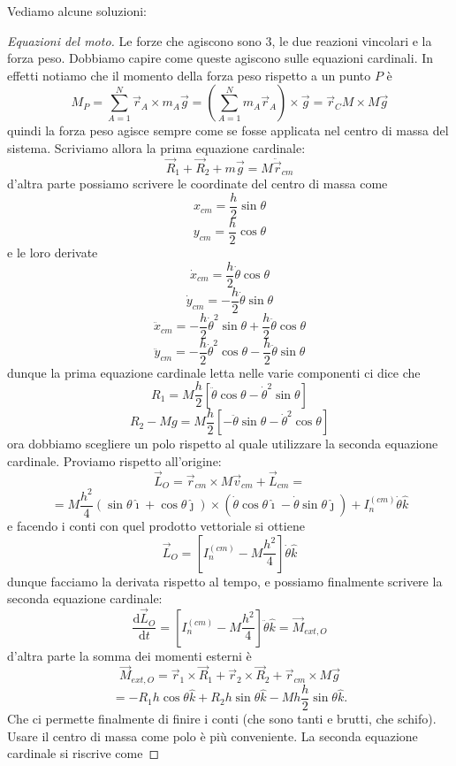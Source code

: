 \documentclass[11pt]{scrartcl}
\newcommand{\dif}{\text{d}}
\newcommand{\ihat}{\hat{\imath}}
\newcommand{\jhat}{\hat{\jmath}}
\newcommand{\khat}{\hat{k}}
\newcommand{\posit}{\vec{r}}
\newcommand{\accel}{\ddot{\vec{r}}}
\begin{document}
	\begin{sol}
		Vediamo alcune soluzioni:
		\begin{proof}[Equazioni del moto]
			Le forze che agiscono sono $3$, le due reazioni vincolari e la forza peso. Dobbiamo capire come queste agiscono sulle equazioni cardinali. In effetti notiamo che il momento della forza peso rispetto a un punto $P$ è
			$$M_P=\sum_{A=1}^{N}\posit_A \times m_A\vec{g}=\left(\sum_{A=1}^{N}m_A\posit_A\right)\times \vec{g}=\posit_CM\times M\vec{g}$$
			quindi la forza peso agisce sempre come se fosse applicata nel centro di massa del sistema. Scriviamo allora la prima equazione cardinale:
			$$\vec{R}_1+\vec{R}_2+m\vec{g}=M\accel_{cm}$$
			d'altra parte possiamo scrivere le coordinate del centro di massa come
			$$x_{cm}=\frac{h}{2}\sin\theta$$
			$$y_{cm}=\frac{h}{2}\cos\theta$$
			e le loro derivate
			$$\dot{x}_{cm}=\frac{h}{2}\dot{\theta}\cos\theta$$
			$$\dot{y}_{cm}=-\frac{h}{2}\dot{\theta}\sin\theta$$
			$$\ddot{x}_{cm}=-\frac{h}{2}\dot{\theta}^2\sin\theta+\frac{h}{2}\ddot{\theta}\cos\theta$$
			$$\ddot{y}_{cm}=-\frac{h}{2}\dot{\theta}^2\cos\theta-\frac{h}{2}\ddot{\theta}\sin\theta$$
			dunque la prima equazione cardinale letta nelle varie componenti ci dice che
			$$R_1=M\frac{h}{2}\left[\ddot{\theta}\cos\theta-\dot{\theta}^2\sin\theta\right]$$
			$$R_2-Mg=M\frac{h}{2}\left[-\ddot{\theta}\sin\theta-\dot{\theta}^2\cos\theta\right]$$
			ora dobbiamo scegliere un polo rispetto al quale utilizzare la seconda equazione cardinale. Proviamo rispetto all'origine:
			$$\vec{L}_O=\posit_{cm}\times M\vec{v}_{cm}+\vec{L}_{cm}=$$
			$$=M\frac{h^2}{4}\left(\sin\theta\ihat+\cos\theta\jhat\right)\times \left(\dot{\theta}\cos\theta\ihat-\dot{\theta}\sin\theta\jhat\right)+I_n^{(cm)}\dot{\theta}\khat$$
			e facendo i conti con quel prodotto vettoriale si ottiene
			$$\vec{L}_O=\left[I_n^{(cm)}-M\frac{h^2}{4}\right]\dot{\theta}\khat$$
			dunque facciamo la derivata rispetto al tempo, e possiamo finalmente scrivere la seconda equazione cardinale:
			$$\frac{\dif \vec{L}_O}{\dif t}=\left[I_n^{(cm)}-M\frac{h^2}{4}\right]\ddot{\theta}\khat=\vec{M}_{ext,O}$$
			d'altra parte la somma dei momenti esterni è
			$$\vec{M}_{ext,O}=\posit_1\times\vec{R}_1+\posit_2\times \vec{R}_2+\posit_{cm}\times M\vec{g}$$
			$$=-R_1h\cos\theta \khat+R_2h\sin\theta\khat-Mh\frac{h}{2}\sin\theta\khat.$$
			Che ci permette finalmente di finire i conti (che sono tanti e brutti, che schifo). \\
			Usare il centro di massa come polo è più conveniente. La seconda equazione cardinale si riscrive come

\end{proof}
\end{sol}
\end{document}
